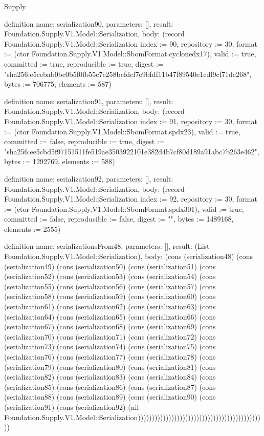 \begin{lexlean}{Supply}
\begin{semanticmodule}
definition{
  name: serialization90,
  parameters: [],
  result: Foundation.Supply.V1.Model::Serialization,
  body: (record Foundation.Supply.V1.Model::Serialization {index := 90, repository := 30, format := (ctor Foundation.Supply.V1.Model::SbomFormat.cyclonedx17), valid := true, committed := true, reproducible := true, digest := "sha256:e5cebab0bc0b5f0fb55c7e258bcfdcf7e9bfdf11b47f89540e1cdf9cf71de268", bytes := 706775, elements := 587})
}

definition{
  name: serialization91,
  parameters: [],
  result: Foundation.Supply.V1.Model::Serialization,
  body: (record Foundation.Supply.V1.Model::Serialization {index := 91, repository := 30, format := (ctor Foundation.Supply.V1.Model::SbomFormat.spdx23), valid := true, committed := false, reproducible := true, digest := "sha256:ee5cbd5f97151511fe519ae3503922101e382d4b7cf80d189a91abc7b263e462", bytes := 1292769, elements := 588})
}

definition{
  name: serialization92,
  parameters: [],
  result: Foundation.Supply.V1.Model::Serialization,
  body: (record Foundation.Supply.V1.Model::Serialization {index := 92, repository := 30, format := (ctor Foundation.Supply.V1.Model::SbomFormat.spdx301), valid := true, committed := false, reproducible := false, digest := "", bytes := 1489168, elements := 2555})
}

definition{
  name: serializationsFrom48,
  parameters: [],
  result: (List Foundation.Supply.V1.Model::Serialization),
  body: (cons (serialization48) (cons (serialization49) (cons (serialization50) (cons (serialization51) (cons (serialization52) (cons (serialization53) (cons (serialization54) (cons (serialization55) (cons (serialization56) (cons (serialization57) (cons (serialization58) (cons (serialization59) (cons (serialization60) (cons (serialization61) (cons (serialization62) (cons (serialization63) (cons (serialization64) (cons (serialization65) (cons (serialization66) (cons (serialization67) (cons (serialization68) (cons (serialization69) (cons (serialization70) (cons (serialization71) (cons (serialization72) (cons (serialization73) (cons (serialization74) (cons (serialization75) (cons (serialization76) (cons (serialization77) (cons (serialization78) (cons (serialization79) (cons (serialization80) (cons (serialization81) (cons (serialization82) (cons (serialization83) (cons (serialization84) (cons (serialization85) (cons (serialization86) (cons (serialization87) (cons (serialization88) (cons (serialization89) (cons (serialization90) (cons (serialization91) (cons (serialization92) (nil Foundation.Supply.V1.Model::Serialization))))))))))))))))))))))))))))))))))))))))))))))
}


\end{semanticmodule}
\end{lexlean}
